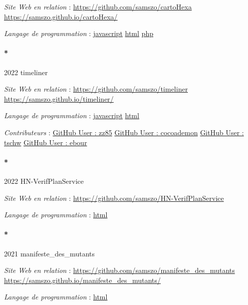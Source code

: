 \documentclass[
  a4paper,
  DIV=11,
  numbers=noendperiod]{scrreprt}
\let\oldparagraph\paragraph
\renewcommand{\paragraph}[1]{\oldparagraph{#1}\mbox{}}
\begin{document}
\emph{Site Web en relation} : \url{https://github.com/samszo/cartoHexa}
\url{https://samszo.github.io/cartoHexa/}

\emph{Langage de programmation} :
\href{http://localhost/samszo/omk/s/fiches/item/89711}{javascript}
\href{http://localhost/samszo/omk/s/fiches/item/96621}{html}
\href{http://localhost/samszo/omk/s/fiches/item/108369}{php}

\paragraph*{2022 timeliner}\label{sec-item301866}

\emph{Site Web en relation} : \url{https://github.com/samszo/timeliner}
\url{https://samszo.github.io/timeliner/}

\emph{Langage de programmation} :
\href{http://localhost/samszo/omk/s/fiches/item/89711}{javascript}
\href{http://localhost/samszo/omk/s/fiches/item/96621}{html}

\emph{Contributeurs} :
\href{http://localhost/samszo/omk/s/fiches/item/301705}{GitHub User :
zz85} \href{http://localhost/samszo/omk/s/fiches/item/301707}{GitHub
User : cocoademon}
\href{http://localhost/samszo/omk/s/fiches/item/301709}{GitHub User :
tschw} \href{http://localhost/samszo/omk/s/fiches/item/301711}{GitHub
User : ebour}

\paragraph*{2022 HN-VerifPlanService}\label{sec-item301872}

\emph{Site Web en relation} :
\url{https://github.com/samszo/HN-VerifPlanService}

\emph{Langage de programmation} :
\href{http://localhost/samszo/omk/s/fiches/item/96621}{html}

\paragraph*{2021 manifeste\_des\_mutants}\label{sec-item301862}

\emph{Site Web en relation} :
\url{https://github.com/samszo/manifeste_des_mutants}
\url{https://samszo.github.io/manifeste_des_mutants/}

\emph{Langage de programmation} :
\href{http://localhost/samszo/omk/s/fiches/item/96621}{html}
\end{document}
